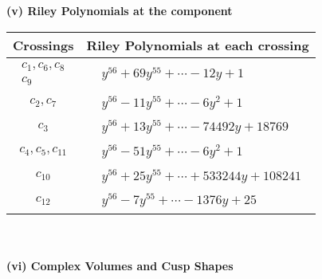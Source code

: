 \documentclass[1p]{elsarticle_modified}
\theoremstyle{definition}
\begin{document}
\newpage\renewcommand{\arraystretch}{1}
\flushleft \textbf{(v) Riley Polynomials at the component}\newline \\
\begin{tabular}{m{50pt}|m{274pt}}
Crossings & \hspace{64pt}Riley Polynomials at each crossing \\
\hline $$\begin{aligned}c_{1},c_{6},c_{8}\\c_{9}\end{aligned}$$&$\begin{aligned}
&y^{56}+69 y^{55}+\cdots-12 y+1
\end{aligned}$\\
\hline $$\begin{aligned}c_{2},c_{7}\end{aligned}$$&$\begin{aligned}
&y^{56}-11 y^{55}+\cdots-6 y^2+1
\end{aligned}$\\
\hline $$\begin{aligned}c_{3}\end{aligned}$$&$\begin{aligned}
&y^{56}+13 y^{55}+\cdots-74492 y+18769
\end{aligned}$\\
\hline $$\begin{aligned}c_{4},c_{5},c_{11}\end{aligned}$$&$\begin{aligned}
&y^{56}-51 y^{55}+\cdots-6 y^2+1
\end{aligned}$\\
\hline $$\begin{aligned}c_{10}\end{aligned}$$&$\begin{aligned}
&y^{56}+25 y^{55}+\cdots+533244 y+108241
\end{aligned}$\\
\hline $$\begin{aligned}c_{12}\end{aligned}$$&$\begin{aligned}
&y^{56}-7 y^{55}+\cdots-1376 y+25
\end{aligned}$\\
\hline
\end{tabular}\\~\\
\newpage\flushleft \textbf{(vi) Complex Volumes and Cusp Shapes}
\end{document}
